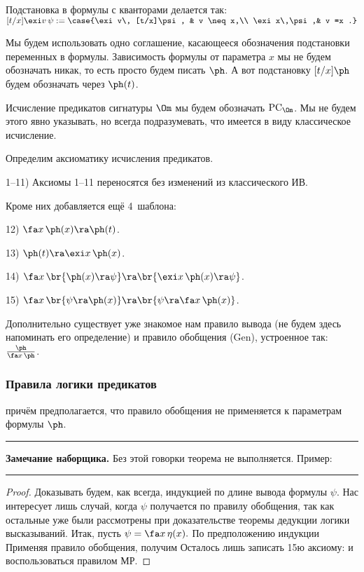 \documentclass[a4paper,draft]{article}
\def\exis#1{\exi#1\,}
\def\fora#1{\fa#1\,}
\newenvironment{nbb}{\par\vskip3pt\hrule\vskip3pt\textbf{\footnotesize Замечание наборщика.}\footnotesize }
{\vskip3pt\hrule\par\vskip3pt}
\DeclareMathOperator{\PC}{PC}
\begin{document}
\begin{df}
  Подстановка в формулы с кванторами делается так:
  $[t/x] \exis{v}\psi := \case{\exis{v} [t/x]\psi, & v \neq x,\\ \exis{x}\psi,& v =x .}$
\end{df}


Мы будем использовать одно соглашение, касающееся обозначения подстановки переменных в формулы.
Зависимость формулы от параметра $x$ мы не будем обозначать никак, то есть просто будем писать $\ph$.
А вот подстановку $[t/x]\ph$ будем обозначать через $\ph(t)$.

\begin{denote}
  Исчисление предикатов сигнатуры $\Om$ мы будем обозначать $\PC_\Om$. Мы не будем этого явно указывать,
  но всегда подразумевать, что имеется в виду классическое исчисление.
\end{denote}

Определим аксиоматику исчисления предикатов.

1--11) Аксиомы 1--11 переносятся без изменений из классического ИВ.

Кроме них добавляется ещё 4~шаблона:

12) $\fora{x}\ph(x) \ra \ph(t)$.

13) $\ph(t) \ra \exis{x}\ph(x)$.

14) $\fora{x}\br{\ph(x) \ra \psi} \ra\br{\exis{x} \ph(x) \ra \psi}$.

15) $\fora{x}\br{\psi \ra \ph(x)} \ra \br{\psi \ra \fora{x}\ph(x)}$.

Дополнительно существует уже знакомое нам правило вывода (не будем здесь напоминать его определение)
и правило обобщения (Gen), устроенное так: $\frac{\ph}{\fora{x} \ph}$.
\subsubsection{Правила логики предикатов}
\begin{theorem}
  \equ{\Ga\vdash (\ph \ra \psi)\Lra\Ga, \ph \vdash \psi,}
    причём предполагается, что правило обобщения не применяется к параметрам формулы $\ph$.
\end{theorem}
\begin{nbb}
Без этой говорки теорема не выполняется. Пример:
\equ{P(x)\vdash\fora xP(x),\quad \not\vdash P(x)\ra\fora xP(x).}
\end{nbb}
\begin{proof}
Доказывать будем, как всегда, индукцией по длине вывода формулы $\psi$.
Нас интересует лишь случай, когда $\psi$ получается по правилу обобщения, так как остальные уже были рассмотрены
при доказательстве теоремы дедукции логики высказываний.
Итак, пусть $\psi=\fora x\eta(x).$ По предположению индукции
Применяя правило обобщения, получим
\equ{\Ga\vdash\fora x\hr{\ph\ra\eta(x)}.}
Осталось лишь записать 15ю аксиому:
\equ{\fora x\hr{\ph\ra\eta(x)}\ra\hr{\ph\ra\fora x\eta(x)}}
и воспользоваться правилом МР.
\end{proof}
\end{document}
